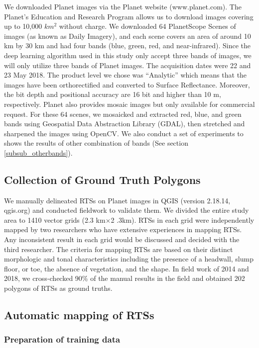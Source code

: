 \documentclass[preprint,12pt,authoryear]{elsarticle}
\begin{document}
We downloaded Planet images via the Planet website (www.planet.com). The Planet’s Education and Research Program allows us to download images covering up to 10,000 $km^2$ without charge. We downloaded 64 PlanetScope Scenes of images (as known as Daily Imagery), and each scene covers an area of around 10 km by 30 km and had four bands (blue, green, red, and near-infrared). Since the deep learning algorithm used in this study only accept three bands of images, we will only utilize three bands of Planet images. The acquisition dates were 22 and 23 May 2018. The product level we chose was “Analytic” which means that the images have been orthorectified and converted to Surface Reflectance. Moreover, the bit depth and positional accuracy are 16 bit and higher than 10 m, respectively. Planet also provides mosaic images but only available for commercial request. For these 64 scenes, we mosaicked and extracted red, blue, and green bands using Geospatial Data Abstraction Library (GDAL), then stretched and sharpened the images using OpenCV. We also conduct a set of experiments to shows the results of other combination of bands (See section \ref{subsub_otherbands}). 

\subsection{Collection of Ground Truth Polygons}
\label{subsec_collect_groundtruth}

We manually delineated RTSs on Planet images in QGIS (version 2.18.14, qgis.org) and conducted fieldwork to validate them. We divided the entire study area to 1410 vector grids (2.3 km$\times$2 .3km). RTSs in each grid were independently mapped by two researchers who have extensive experiences in mapping RTSs. Any inconsistent result in each grid would be discussed and decided with the third researcher. The criteria for mapping RTSs are based on their distinct morphologic and tonal characteristics including the presence of a headwall, slump floor, or toe, the absence of vegetation, and the shape. In field work of 2014 and 2018, we cross-checked 90\% of the manual results in the field and obtained 202 polygons of RTSs as ground truths.     

\subsection{Automatic mapping of RTSs}
\label{subsec_auto_mapping}

\subsubsection{Preparation of training data}
\label{subsubsec_pre_trainingdata}
\end{document}
